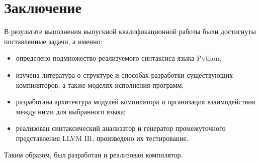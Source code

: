 \newpage
\section*{Заключение}

В результате выполнения выпускной квалификационной работы были достигнуты поставленные задачи, а именно:

\begin{itemize}
    \item определено подмножество реализуемого синтаксиса языка Python;
    \item изучена литература о структуре и способах разработки существующих компиляторов, а также моделях исполнения программ;
    \item разработана архитектура модулей компилятора и организация взаимодействия между ними для выбранного языка;
    \item реализован синтаксический анализатор и генератор промежуточного представления LLVM IR, произведено их тестирование.
\end{itemize}

Таким образом, был разработан и реализован компилятор.

